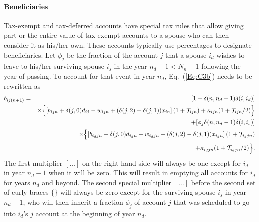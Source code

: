 \documentclass{report}[fleqn,11pt]
\begin{document}
\paragraph*{Beneficiaries}
Tax-exempt and tax-deferred accounts have special tax rules that allow giving part
or the entire value of
tax-exempt accounts to a spouse who can then consider it as his/her own.
These accounts typically use percentages to designate beneficiaries.
Let $\phi_j$ be the fraction of the account $j$ that a spouse $i_d$ wishes
to leave to his/her surviving spouse $i_s$
in the year $n_d  - 1 < N_n - 1$ following the year of passing. 
To account for that event in year $n_d$, Eq.~(\ref{Eq:C3b}) needs to be rewritten as
\begin{eqnarray}
	b_{ij(n+1)} &=& [1 - \delta(n, n_d-1)\delta(i, i_d)] \nonumber \\
	&&\times \Bigl\{\left[b_{ijn} + \delta(j, 0)d_{ij} - w_{ijn}
	+ (\delta(j, 2) - \delta(j, 1))x_{in}
	\right](1 + \mathcal{T}_{ijn})
	+ \kappa_{ijn}(1 + \mathcal{T}_{ijn}/2) 
	\Bigr\}\nonumber \\
	&& + [\phi_j\delta(n, n_d-1)\delta(i, i_s)] \nonumber  \\
	&& \times \Bigl\{\left[b_{i_djn}
	+ \delta(j, 0)d_{i_dn}
	- w_{i_djn}
	+ (\delta(j, 2) - \delta(j, 1))x_{i_dn}
	\right] (1 + \mathcal{T}_{i_djn})
	\nonumber\\
	&& + \kappa_{i_djn}(1 + \mathcal{T}_{i_djn}/2) 
	\Bigr\}.
\end{eqnarray}
The first multiplier $[\ldots]$ on the right-hand side will always be one except for $i_d$ in
year $n_d-1$ when it will be zero. This will result in emptying all accounts for $i_d$ for years
$n_d$ and beyond.
The second special multiplier $[\ldots]$ before the second set of curly braces
$\{\}$ will always be zero except for the surviving
spouse $i_s$ in year $n_d-1$, who will then inherit a fraction $\phi_j$ of account $j$ that
was scheduled to go into $i_d$'s $j$ account at the beginning of year $n_d$.
\end{document}
